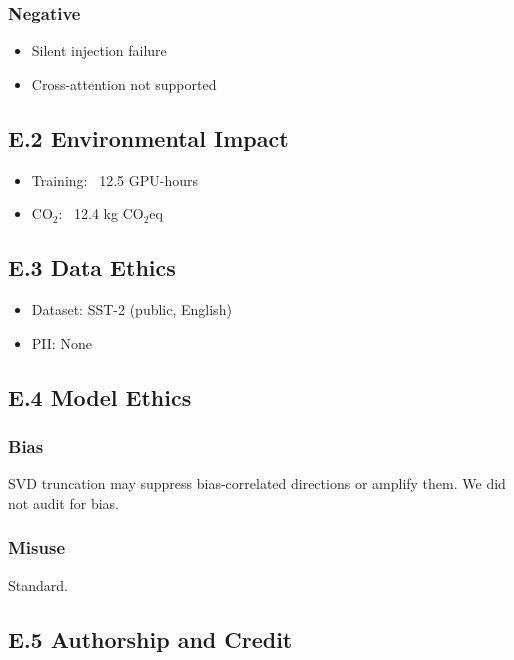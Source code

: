 \subsubsection{Negative}
\begin{itemize}
\item Silent injection failure
\item Cross-attention not supported

\end{itemize}
\subsection{E.2 Environmental Impact}

\begin{itemize}
\item Training: ~12.5 GPU-hours
\item CO$_2$: ~12.4 kg CO$_2$eq

\end{itemize}
\subsection{E.3 Data Ethics}

\begin{itemize}
\item Dataset: SST-2 (public, English)
\item PII: None

\end{itemize}
\subsection{E.4 Model Ethics}

\subsubsection{Bias}

SVD truncation may suppress bias-correlated directions or amplify them. 
We did not audit for bias.

\subsubsection{Misuse}

Standard.

\subsection{E.5 Authorship and Credit}

